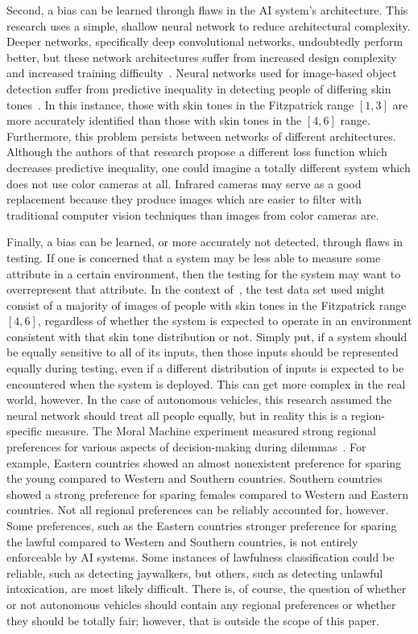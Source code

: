 \documentclass[]{report}
\begin{document}
Second, a bias can be learned through flaws in the AI system's architecture. This research uses a
simple, shallow neural network to reduce architectural complexity. Deeper networks, specifically
deep convolutional networks, undoubtedly perform better, but these network architectures suffer from
increased design complexity and increased training difficulty~\cite{mhaskar2016deep}. Neural
networks used for image-based object detection suffer from predictive inequality in detecting people
of differing skin tones~\cite{wilson2019predictive}. In this instance, those with skin tones in the
Fitzpatrick range $[1, 3]$ are more accurately identified than those with skin tones in the $[4, 6]$
range. Furthermore, this problem persists between networks of different architectures. Although the
authors of that research propose a different loss function which decreases predictive inequality,
one could imagine a totally different system which does not use color cameras at all. Infrared
cameras may serve as a good replacement because they produce images which are easier to filter with
traditional computer vision techniques than images from color cameras are.

Finally, a bias can be learned, or more accurately not detected, through flaws in testing. If one is
concerned that a system may be less able to measure some attribute in a certain environment, then
the testing for the system may want to overrepresent that attribute. In the context
of~\cite{wilson2019predictive}, the test data set used might consist of a majority of images of
people with skin tones in the Fitzpatrick range $[4, 6]$, regardless of whether the system is
expected to operate in an environment consistent with that skin tone distribution or not. Simply
put, if a system should be equally sensitive to all of its inputs, then those inputs should be
represented equally during testing, even if a different distribution of inputs is expected to be
encountered when the system is deployed. This can get more complex in the real world, however. In
the case of autonomous vehicles, this research assumed the neural network should treat all people
equally, but in reality this is a region-specific measure. The Moral Machine experiment measured
strong regional preferences for various aspects of decision-making during
dilemmas~\cite{awad2018moral}. For example, Eastern countries showed an almost nonexistent
preference for sparing the young compared to Western and Southern countries. Southern countries
showed a strong preference for sparing females compared to Western and Eastern countries. Not all
regional preferences can be reliably accounted for, however. Some preferences, such as the Eastern
countries stronger preference for sparing the lawful compared to Western and Southern countries, is
not entirely enforceable by AI systems. Some instances of lawfulness classification could be
reliable, such as detecting jaywalkers, but others, such as detecting unlawful intoxication, are
most likely difficult. There is, of course, the question of whether or not autonomous vehicles
should contain any regional preferences or whether they should be totally fair; however, that is
outside the scope of this paper.
\end{document}

